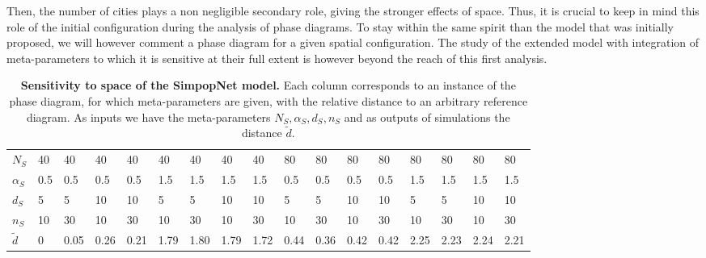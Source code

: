 \documentclass[graybox]{svmult}
\begin{document}
Then, the number of cities plays a non negligible secondary role, giving the stronger effects of space. Thus, it is crucial to keep in mind this role of the initial configuration during the analysis of phase diagrams. To stay within the same spirit than the model that was initially proposed, we will however comment a phase diagram for a given spatial configuration. The study of the extended model with integration of meta-parameters to which it is sensitive at their full extent is however beyond the reach of this first analysis.




\begin{table}[!ht]
\caption{\textbf{Sensitivity to space of the SimpopNet model.} Each column corresponds to an instance of the phase diagram, for which meta-parameters are given, with the relative distance to an arbitrary reference diagram. As inputs we have the meta-parameters $N_S,\alpha_S,d_S,n_S$ and as outputs of simulations the distance $\tilde{d}$.\label{tab:macrocoevolexplo:spacematters}}
\centering
\begin{tabular}{|l|l|l|l|l|l|l|l|l|l|l|l|l|l|l|l|l|}
\hline
$N_S$ & 40 & 40 & 40 & 40 & 40 & 40 & 40 & 40 & 80 & 80 & 80 & 80 & 80 & 80 & 80 & 80\\
$\alpha_S$ & 0.5 & 0.5 & 0.5 & 0.5 & 1.5 & 1.5 & 1.5 & 1.5 & 0.5 & 0.5 & 0.5 & 0.5 & 1.5 & 1.5 & 1.5 & 1.5\\
$d_S$ & 5 & 5 & 10 & 10 & 5 & 5 & 10 & 10 & 5 & 5 & 10 & 10 & 5 & 5 & 10 & 10\\
$n_S$ & 10 & 30 & 10 & 30 & 10 & 30 & 10 & 30 & 10 & 30 & 10 & 30 & 10 & 30 & 10 & 30\\\hline
$\tilde{d}$ & 0 & 0.05 & 0.26 & 0.21 & 1.79 & 1.80 & 1.79 & 1.72 & 0.44 & 0.36 & 0.42 & 0.42 & 2.25 & 2.23 & 2.24 & 2.21\\\hline
\end{tabular}
\end{table}
\end{document}
